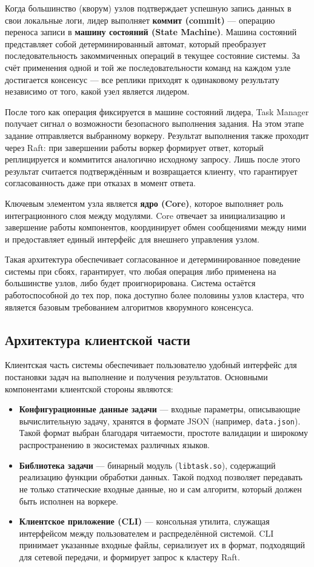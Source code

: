 Когда большинство (кворум) узлов подтверждает успешную запись данных в свои
локальные логи, лидер выполняет \textbf{коммит (commit)} — операцию переноса
записи в \textbf{машину состояний (State Machine)}. Машина состояний
представляет собой детерминированный автомат, который преобразует
последовательность закоммиченных операций в текущее состояние системы. За счёт
применения одной и той же последовательности команд на каждом узле достигается
консенсус — все реплики приходят к одинаковому результату независимо от того,
какой узел является лидером.

После того как операция фиксируется в машине состояний лидера, Task Manager
получает сигнал о возможности безопасного выполнения задания. На этом этапе
задание отправляется выбранному воркеру. Результат выполнения также проходит
через Raft: при завершении работы воркер формирует ответ, который реплицируется
и коммитится аналогично исходному запросу. Лишь после этого результат считается
подтверждённым и возвращается клиенту, что гарантирует согласованность даже при
отказах в момент ответа.

Ключевым элементом узла является \textbf{ядро (Core)}, которое выполняет роль
интеграционного слоя между модулями. Core отвечает за инициализацию и
завершение работы компонентов, координирует обмен сообщениями между ними и
предоставляет единый интерфейс для внешнего управления узлом.

Такая архитектура обеспечивает согласованное и детерминированное поведение
системы при сбоях, гарантирует, что любая операция либо применена на
большинстве узлов, либо будет проигнорирована. Система остаётся работоспособной
до тех пор, пока доступно более половины узлов кластера, что является базовым
требованием алгоритмов кворумного консенсуса.

\subsection{Архитектура клиентской части}

Клиентская часть системы обеспечивает пользователю удобный интерфейс
для постановки задач на выполнение и получения результатов.
Основными компонентами клиентской стороны являются:
\begin{itemize}
    \item \textbf{Конфигурационные данные задачи} — входные параметры,
    описывающие вычислительную задачу, хранятся в формате JSON
    (например, \texttt{data.json}). Такой формат выбран благодаря
    читаемости, простоте валидации и широкому распространению
    в экосистемах различных языков.
    \item \textbf{Библиотека задачи} — бинарный модуль
    (\texttt{libtask.so}), содержащий реализацию функции обработки данных.
    Такой подход позволяет передавать не только статические входные данные,
    но и сам алгоритм, который должен быть исполнен на воркере.
    \item \textbf{Клиентское приложение (CLI)} — консольная утилита,
    служащая интерфейсом между пользователем и распределённой системой.
    CLI принимает указанные входные файлы, сериализует их в формат,
    подходящий для сетевой передачи, и формирует запрос к кластеру Raft.
\end{itemize}


